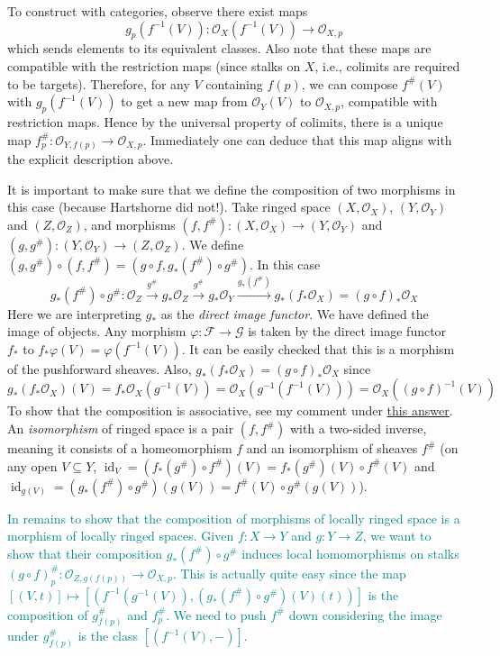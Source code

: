 \documentclass[12pt]{article}
\theoremstyle{remark}
\newcommand{\id}[0]{\operatorname{id}}
\begin{document}
	To construct with categories, observe there exist maps 
	\[g_p(f^{-1}(V)):\mathscr O_X(f^{-1}(V))\to \mathscr O_{X, p}\] 
	which sends elements to its equivalent classes. Also note that these maps are compatible with the restriction maps (since stalks on $X$, i.e., colimits are required to be targets). Therefore, for any $V$ containing $f(p)$, we can compose $f^\#(V)$ with $g_p(f^{-1}(V))$ to get a new map from $\mathscr O_{Y}(V)$ to $\mathscr O_{X, p}$, compatible with restriction maps. Hence by the universal property of colimits, there is a unique map $f^\#_p:\mathscr O_{Y, f(p)}\to \mathscr O_{X,p}$. Immediately one can deduce that this map aligns with the explicit description above.
	
	It is important to make sure that we define the composition of two morphisms in this case (because Hartshorne did not!). Take ringed space $(X, \mathscr O_X)$, $(Y, \mathscr O_Y)$ and $(Z, \mathscr O_Z)$, and morphisms $(f, f^\#):(X, \mathscr O_X)\to (Y, \mathscr O_Y)$ and $(g, g^\#):(Y, \mathscr O_Y)\to (Z, \mathscr O_Z)$. We define $(g,g^\#)\circ (f, f^\#)=(g\circ f, g_*(f^\#)\circ g^\#)$. In this case 
	\[g_*(f^\#)\circ g^\#:\mathscr O_Z\xrightarrow{g^\#}g_*\mathscr O_Z\xrightarrow{g^\#}g_*\mathscr O_Y\xrightarrow{g_*(f^\#)}g_*(f_*\mathscr O_X)=(g\circ f)_*\mathscr O_X\]
	Here we are interpreting $g_*$ as the \textit{direct image functor}. We have defined the image of objects. Any morphism $\varphi:\mathscr F\to\mathscr G$ is taken by the direct image functor $f_*$ to $f_*\varphi(V)=\varphi(f^{-1}(V))$. It can be easily checked that this is a morphism of the pushforward sheaves. Also, $g_*(f_*\mathscr O_X)=(g\circ f)_*\mathscr O_X$ since 
	\[g_*(f_*\mathscr O_X)(V)=f_*\mathscr O_X(g^{-1}(V))=\mathscr O_X(g^{-1}(f^{-1}(V)))=\mathscr O_X((g\circ f)^{-1}(V))\]
	To show that the composition is associative, see my comment under \href{https://math.stackexchange.com/q/611617}{this answer}. An \textit{isomorphism} of ringed space is a pair $(f, f^\#)$ with a two-sided inverse, meaning it consists of a homeomorphism $f$ and an isomorphism of sheaves $f^\#$ (on any open $V\subseteq Y$, $\id_V=(f_*(g^\#)\circ f^\#)(V)=f_*(g^\#)(V)\circ f^\#(V)$ and $\id_{g(V)}=(g_*(f^\#)\circ g^\#)(g(V))=f^\#(V)\circ g^\#(g(V))$). 
	
	\textcolor{teal}{In remains to show that the composition of morphisms of locally ringed space is a morphism of locally ringed spaces. Given $f:X\to Y$ and $g:Y\to Z$, we want to show that their composition $g_*(f^\#)\circ g^\#$ induces local homomorphisms on stalks $(g\circ f)^\#_p:\mathscr O_{Z, g(f(p))}\to \mathscr O_{X, p}$. This is actually quite easy since the map $[(V, t)]\mapsto [(f^{-1}(g^{-1}(V)), (g_*(f^\#)\circ g^\#)(V)(t))]$ is the composition of $g^\#_{f(p)}$ and $f^\#_{p}$. We need to push $f^\#$ down considering the image under $g^\#_{f(p)}$ is the class $[(f^{-1}(V),-)]$.}
	
\end{document}
